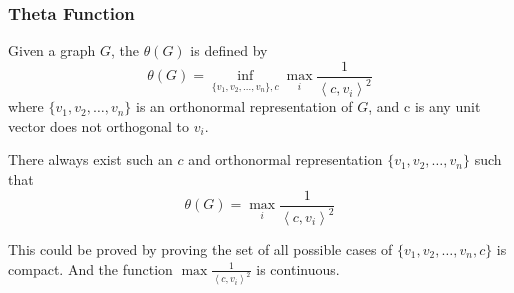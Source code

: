 \documentclass{beamer}
\begin{document}
                  \begin{frame}
                        \frametitle{Theta Function}
                        Given a graph $ G $, the $ \theta(G) $ is defined by
                        \begin{equation}
                              \theta(G) = \inf_{\{v_1, v_2, \dots, v_n\},c} \max_{i} \frac{1}{\left<c,v_{i}\right>^2}
                        \end{equation}
                        where $ \{v_1, v_2, \dots, v_n\} $ is an orthonormal representation of $ G $, and c is any unit vector does not orthogonal to $ v_i $.

                        \pause

                        \begin{lemma}
                              There always exist such an $c$ and orthonormal representation $ \{v_1, v_2, \dots, v_n\} $ such that
                              \begin{equation}
                                    \theta(G) = \max_{i} \frac{1}{\left<c,v_{i}\right>^2}
                              \end{equation}
                        \end{lemma}

                        This could be proved by proving the set of all possible cases of $ \{v_1, v_2, \dots, v_n,c \} $ is compact. And the function $ \max \frac{1}{\left<c,v_{i}\right>^2} $ is continuous.
                  \end{frame}
\end{document}
